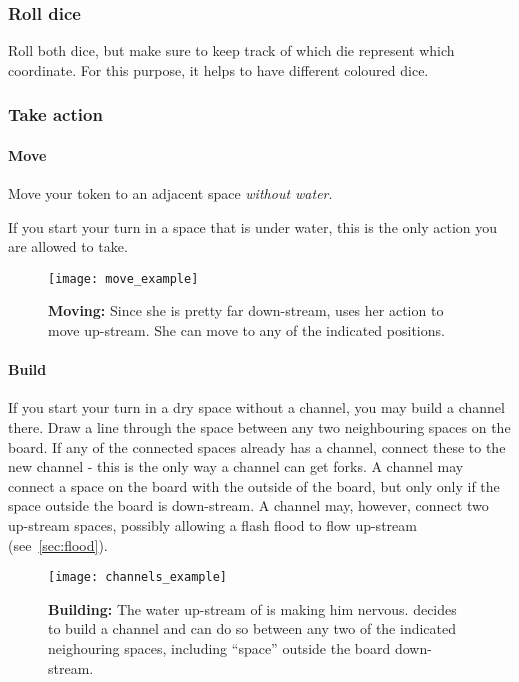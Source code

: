 \subsubsection{Roll dice}
Roll both dice, but make sure to keep track of which die represent which
coordinate. For this purpose, it helps to have different coloured dice.

\subsubsection{Take action}
\paragraph{Move}
Move your token to an adjacent space \emph{without water}.

If you start your turn in a space that is under water, this is the only action
you are allowed to take.

\begin{SCfigure}
    \centering
    \caption{\textbf{Moving:} Since she is pretty far down-stream, \Kim{} uses
        her action to move up-stream. She can move to any of the indicated
        positions.}
    \texttt{[image: move\_example]}
    \label{fig:move_example}
\end{SCfigure}

\paragraph{Build}
If you start your turn in a dry space without a channel, you may build a
channel there. Draw a line through the space between any two neighbouring
spaces on the board. If any of the connected spaces already has a channel,
connect these to the new channel - this is the only way a channel can get
forks. A channel may connect a space on the board with the outside of the
board, but only only if the space outside the board is down-stream. A channel
may, however, connect two up-stream spaces, possibly allowing a flash flood to
flow up-stream (see~\ref{sec:flood}).

\begin{SCfigure}
    \centering
    \caption{\textbf{Building:} The water up-stream of \Rufus{} is making him
        nervous. \Rufus{} decides to build a channel and can do so between any
        two of the indicated neighouring spaces, including ``space'' outside
        the board down-stream.}
    \texttt{[image: channels\_example]}
    \label{fig:channels_example}
\end{SCfigure}

